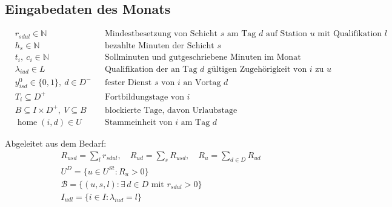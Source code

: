 \documentclass[11pt]{combiArticle}
\newcommand{\Dm}{D^{-}}
\newcommand{\Dp}{D^{+}}
\begin{document}
\subsection{Eingabedaten des Monats}

\begin{align}
  & r_{sdul} \in \mathbb{N} && \text{Mindestbesetzung von Schicht } s \text{ am Tag } d \text{ auf Station } u \text{ mit Qualifikation } l \label{par:r}\\
  & h_s \in \mathbb{N} && \text{bezahlte Minuten der Schicht } s \label{par:h}\\
  & t_i,\ c_i \in \mathbb{N} && \text{Sollminuten und gutgeschriebene Minuten im Monat} \label{par:t}\\
  & \lambda_{iud} \in L && \text{Qualifikation der an Tag } d \text{ gültigen Zugehörigkeit von } i \text{ zu } u \label{par:lambda}\\
  & y^{0}_{isd} \in \{0,1\},\ d \in \Dm && \text{fester Dienst } s \text{ von } i \text{ an Vortag } d \label{par:y0}\\
  & T_i \subseteq \Dp && \text{Fortbildungstage von } i \label{par:T}\\
  & B \subseteq I \times \Dp,\ V \subseteq B && \text{blockierte Tage, davon Urlaubstage} \label{par:B}\\
  & \operatorname{home}(i,d) \in U && \text{Stammeinheit von } i \text{ am Tag } d \label{par:home}
\end{align}

Abgeleitet aus dem Bedarf:
\begin{align}
  & R_{usd} = \textstyle\sum_{l} r_{sdul},\quad R_{ud} = \sum_{s} R_{usd},\quad R_{u} = \sum_{d \in D} R_{ud} \label{par:R}\\
  & U^{D} = \{u \in U^{St} : R_u > 0\} \label{par:UD}\\
  & \mathcal{B} = \{(u,s,l) : \exists\, d \in D \text{ mit } r_{sdul} > 0\} \label{par:demanded}\\
  & I_{udl} = \{i \in I : \lambda_{iud} = l\} \label{par:Iudl}
\end{align}
\end{document}
